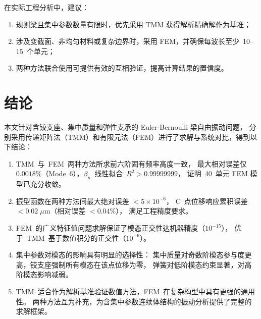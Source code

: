 \documentclass[twoside,12pt]{ctexart}
\newcommand{\betan}{\beta_n}
\begin{document}
在实际工程分析中，建议：
\begin{enumerate}
  \item 规则梁且集中参数数量有限时，优先采用 TMM 获得解析精确解作为基准；
  \item 涉及变截面、非均匀材料或复杂边界时，采用 FEM，并确保每波长至少~10--15~个单元；
  \item 两种方法联合使用可提供有效的互相验证，提高计算结果的置信度。
\end{enumerate}

\section{结论}

本文针对含铰支座、集中质量和弹性支承的 Euler-Bernoulli 梁自由振动问题，
分别采用传递矩阵法（TMM）和有限元法（FEM）进行了求解与系统对比，得到以下结论：

\begin{enumerate}
  \item TMM~与~FEM~两种方法所求前六阶固有频率高度一致，
        最大相对误差仅~$0.0018\%$（Mode~6），$\betan$~线性拟合~$R^2>0.99999999$，
        证明~40~单元 FEM 模型已充分收敛。
  \item 振型函数在两种方法间最大绝对误差 $<5\times10^{-6}$，
        C~点位移响应累积误差 $<0.02\;\mu\text{m}$（相对误差 $<0.04\%$），
        满足工程精度要求。
  \item FEM~的广义特征值问题求解保证了模态正交性达机器精度（$10^{-15}$），
        优于~TMM~基于数值积分的正交性（$10^{-6}$）。
  \item 集中参数对模态的影响具有明显的选择性：
        集中质量对奇数阶模态参与度更高，铰支座强制所有模态在该点位移为零，
        弹簧对低阶模态约束显著，对高阶模态影响减弱。
  \item TMM~适合作为解析基准验证数值方法，FEM~在复杂构型中具有更强的通用性。
        两种方法互为补充，为含集中参数连续体结构的振动分析提供了完整的求解框架。
\end{enumerate}
\end{document}
